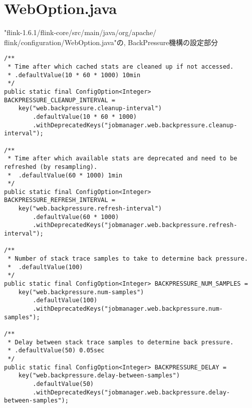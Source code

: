 \documentclass[11pt]{jreport}
\begin{document}
\chapter{WebOption.java}

"flink-1.6.1/flink-core/src/main/java/org/apache/
flink/configuration/WebOption.java"の,  BackPressure機構の設定部分

{
\footnotesize

\begin{verbatim}
/**
 * Time after which cached stats are cleaned up if not accessed.
 * .defaultValue(10 * 60 * 1000) 10min
 */
public static final ConfigOption<Integer> BACKPRESSURE_CLEANUP_INTERVAL =
	key("web.backpressure.cleanup-interval")
		.defaultValue(10 * 60 * 1000)
		.withDeprecatedKeys("jobmanager.web.backpressure.cleanup-interval");

/**
 * Time after which available stats are deprecated and need to be refreshed (by resampling).
 * 	.defaultValue(60 * 1000) 1min
 */
public static final ConfigOption<Integer> BACKPRESSURE_REFRESH_INTERVAL =
	key("web.backpressure.refresh-interval")
		.defaultValue(60 * 1000)
		.withDeprecatedKeys("jobmanager.web.backpressure.refresh-interval");

/**
 * Number of stack trace samples to take to determine back pressure.
 * 	.defaultValue(100)
 */
public static final ConfigOption<Integer> BACKPRESSURE_NUM_SAMPLES =
	key("web.backpressure.num-samples")
		.defaultValue(100)
		.withDeprecatedKeys("jobmanager.web.backpressure.num-samples");

/**
 * Delay between stack trace samples to determine back pressure.
 * .defaultValue(50) 0.05sec
 */
public static final ConfigOption<Integer> BACKPRESSURE_DELAY =
	key("web.backpressure.delay-between-samples")
		.defaultValue(50)
		.withDeprecatedKeys("jobmanager.web.backpressure.delay-between-samples");

\end{verbatim}
}

%
\end{document}
